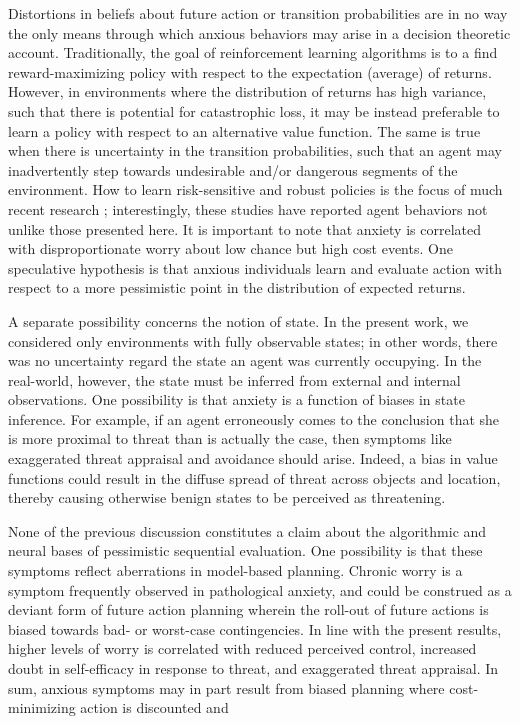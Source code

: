 \documentclass[11pt]{article} %
\begin{document}
Distortions in beliefs about future action or transition probabilities are in no way the only means through which anxious behaviors may arise in a decision theoretic account. Traditionally, the goal of reinforcement learning algorithms is to a find reward-maximizing policy with respect to the expectation (average) of returns. However, in environments where the distribution of returns has high variance, such that there is potential for catastrophic loss, it may be instead preferable to learn a policy with respect to an alternative value function. The same is true when there is uncertainty in the transition probabilities, such that an agent may inadvertently step towards undesirable and/or dangerous segments of the environment. How to learn risk-sensitive and robust policies is the focus of much recent research \cite{morimura2012, chow2015, bellemare2017}; interestingly, these studies have reported agent behaviors not unlike those presented here. It is important to note that anxiety is correlated with disproportionate worry about low chance but high cost events\cite{Miceli2005}. One speculative hypothesis is that anxious individuals learn and evaluate action with respect  to a more pessimistic point in the distribution of expected returns.

A separate possibility concerns the notion of state. In the present work, we considered only environments with fully observable states; in other words, there was no uncertainty regard the state an agent was currently occupying. In the real-world, however, the state must be inferred from external and internal observations. One possibility is that anxiety is a function of biases in state inference\cite{Paulus2012}. For example, if an agent erroneously comes to the conclusion that she is more proximal to threat than is actually the case, then symptoms like exaggerated threat appraisal and avoidance should arise. Indeed, a bias in value functions could result in the diffuse spread of threat across objects\citep{norbury2018} and location\citep{schulz2018}, thereby causing otherwise benign states to be perceived as threatening. 

None of the previous discussion constitutes a claim about the algorithmic and neural bases of pessimistic sequential evaluation. One possibility is that these symptoms reflect aberrations in model-based planning. Chronic worry is a symptom frequently observed in pathological anxiety, and could be construed as a deviant form of future action planning wherein the roll-out of future actions is biased towards bad- or worst-case contingencies. In line with the present results, higher levels of worry is correlated with reduced perceived control, increased doubt in self-efficacy in response to threat, and exaggerated threat appraisal\cite{Berenbaum2010}. In sum, anxious symptoms may in part result from biased planning where cost-minimizing action is discounted and 
\end{document}
